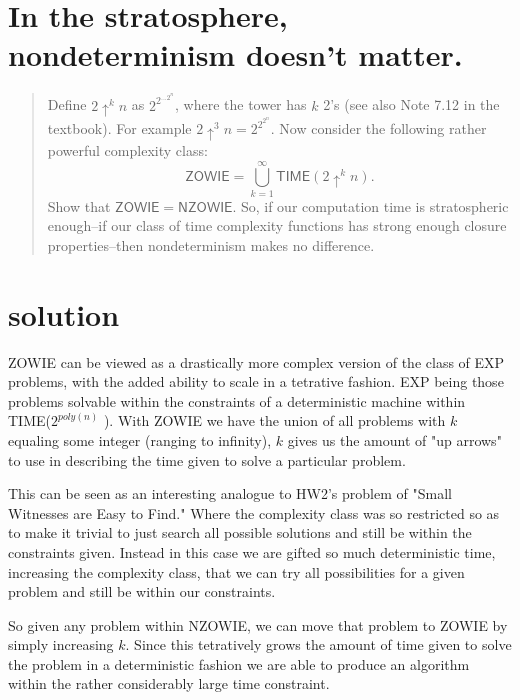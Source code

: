 

\maketitle
\thispagestyle{firststyle}
\vspace{-2.0cm}

\section{In the stratosphere, nondeterminism doesn’t matter.}
    \begin{quote}
    Define $2\uparrow^k n$ as $2^{2^{...2^n}}$, where the tower has $k$ 2's (see also Note 7.12 in the textbook).
    For example $2 \uparrow^3 n = 2^{2^{2^n}}$.
    Now consider the following rather powerful complexity class:
    \[
        \mathsf{ZOWIE} =
        \bigcup_{k=1}^\infty \mathsf{TIME}(2\uparrow^k n).
    \]
    Show that $\mathsf{ZOWIE} = \mathsf{NZOWIE}$.
    So, if our computation time is stratospheric enough--if our class of time complexity functions has strong enough closure properties--then nondeterminism makes no difference.
    \end{quote}
    
\section*{solution}



ZOWIE can be viewed as a drastically more complex version of the class of EXP problems, with the added ability to scale in a tetrative fashion. EXP being those problems solvable within the constraints of a deterministic machine within TIME($2^{poly(n)}$ ). With ZOWIE we have the union of all problems with $k$ equaling some integer (ranging to infinity), $k$ gives us the amount of "up arrows" to use in describing the time given to solve a particular problem. 

This can be seen as an interesting analogue to HW2's problem of "Small Witnesses are Easy to Find." Where the complexity class was so restricted so as to make it trivial to just search all possible solutions and still be within the constraints given. Instead in this case we are gifted so much deterministic time, increasing the complexity class, that we can try all possibilities for a given problem and still be within our constraints. 

So given any problem within NZOWIE, we can move that problem to ZOWIE by simply increasing $k$. Since this tetratively grows the amount of time given to solve the problem in a deterministic fashion we are able to produce an algorithm within the rather considerably large time constraint.     
    
    
    

